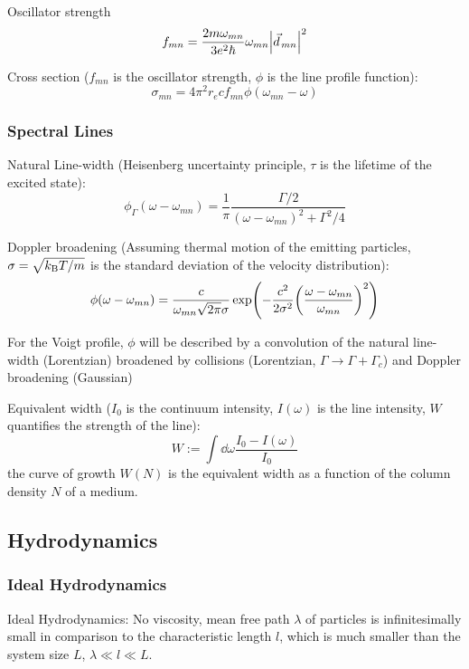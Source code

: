 			\noindent
			Oscillator strength
			\begin{equation}
				f_{mn} = \frac{2 m \omega_{mn}}{3 e^2 \hbar} \omega_{mn} \abs{\vec{d}_{mn}}^2
			\end{equation}

			\noindent
			Cross section ($f_{mn}$ is the oscillator strength, $\phi$ is the line profile function):
			\begin{equation}
				\sigma_{mn} = 4 \pi^2 r_e c f_{mn} \phi(\omega_{mn} - \omega)
			\end{equation}

		\subsubsection{Spectral Lines}
			Natural Line-width (Heisenberg uncertainty principle, $\tau$ is the lifetime of the excited state):
			\begin{equation}
				\phi_\Gamma(\omega-\omega_{mn}) = \frac{1}{\pi} \frac{\Gamma / 2}{(\omega-\omega_{mn})^2 + \Gamma^2 / 4}
			\end{equation}

			\noindent
			Doppler broadening (Assuming thermal motion of the emitting particles, $\sigma = \sqrt{k_{\text{B}} T / m}$ is the standard deviation of the velocity distribution):
			\begin{equation}
				\phi(\omega-\omega_{mn}) = \frac{c}{\omega_{mn} \sqrt{ 2\pi} \sigma} \exp(-\frac{c^2}{2\sigma^2}\qty(\frac{\omega-\omega_{mn}}{\omega_{mn}})^2)
			\end{equation}

			\noindent
			For the Voigt profile, $\phi$ will be described by a convolution of the natural line-width (Lorentzian) broadened by collisions (Lorentzian, $\Gamma \to \Gamma + \Gamma_c$) and Doppler broadening (Gaussian)

			Equivalent width ($I_0$ is the continuum intensity, $I(\omega)$ is the line intensity, $W$ quantifies the strength of the line):
			\begin{equation}
				W := \int\dd{\omega} \frac{I_0 - I(\omega)}{I_0}
			\end{equation}
			the curve of growth $W(N)$ is the equivalent width as a function of the column density $N$ of a medium.

	\subsection{Hydrodynamics}
		\subsubsection{Ideal Hydrodynamics}
			Ideal Hydrodynamics: No viscosity, mean free path $\lambda$ of particles is infinitesimally small in comparison to the characteristic length $l$, which is much smaller than the system size $L$, \ie $\lambda \ll l \ll L$.

